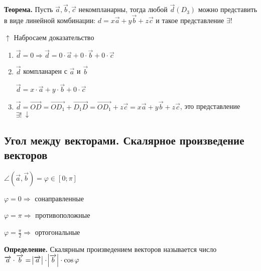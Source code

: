 \documentclass{article}
\begin{document}
    \textbf{Теорема.} Пусть \(\overrightarrow{a}, \overrightarrow{b}, \overrightarrow{c}\) некомпланарны, тогда любой \(\overrightarrow{d}(D_3)\) можно представить в виде линейной комбинации: \( d = x\overrightarrow{a} + y\overrightarrow{b} + z\overrightarrow{c} \) и такое представление \(\exists!\)

    \(\uparrow\) Набросаем доказательство

    \begin{enumerate}
        \item \( \overrightarrow{d} = 0 \Rightarrow \overrightarrow{d} = 0\cdot\overrightarrow{a} + 0\cdot\overrightarrow{b} + 0\cdot\overrightarrow{c} \)
    

        \item \( \overrightarrow{d} \) компланарен с \( \overrightarrow{a} \) и \( \overrightarrow{b} \)
        
        \( \overrightarrow{d} = x\cdot\overrightarrow{a} + y\cdot\overrightarrow{b} + 0\cdot\overrightarrow{c} \)

        
        \item \(\overrightarrow{d} = \overrightarrow{OD} = \overrightarrow{OD_1} + \overrightarrow{D_1D} = \overrightarrow{OD_1} + z\overrightarrow{c} = x\overrightarrow{a} + y\overrightarrow{b} + z\overrightarrow{c}\), это представление \(\exists!\ \downarrow\)
    \end{enumerate}
    
    \subsection{Угол между векторами. Скалярное произведение векторов}

    
    \(\angle (\overrightarrow{a}, \overrightarrow{b}) = \varphi \in [0; \pi]\)
    
    \( \varphi = 0 \Rightarrow \) сонаправленные
    
    \( \varphi = \pi \Rightarrow \) противоположные
    
    \( \varphi = \frac{\pi}{2} \Rightarrow \) ортогональные

    \textbf{Определение.} Скалярным произведением векторов называется число \( \overrightarrow{a}\cdot\overrightarrow{b} = \abs{\overrightarrow{a}}\cdot\abs{\overrightarrow{b}}\cdot\cos\varphi \)
    
\end{document}
